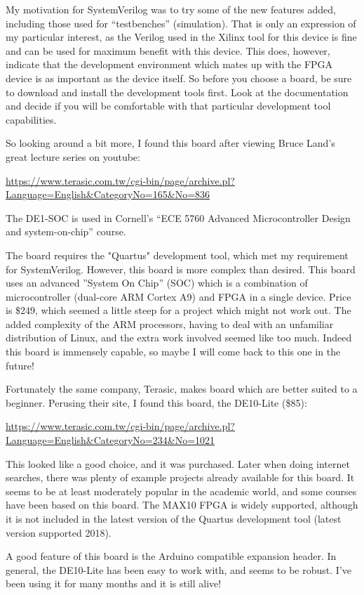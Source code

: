 My motivation for SystemVerilog was to try some of the new features added, including those used for ``testbenches'' (simulation).  That is only an expression of my particular interest, as the Verilog used in the Xilinx tool for this device is fine and can be used for maximum benefit with this device.  This does, however, indicate that the development environment which mates up with the FPGA device is as important as the device itself.  So before you choose a board, be sure to download and install the development tools first.  Look at the documentation and decide if you will be comfortable with that particular development tool capabilities.

So looking around a bit more, I found this board after viewing Bruce Land's great lecture series on youtube:

\url{https://www.terasic.com.tw/cgi-bin/page/archive.pl?Language=English&CategoryNo=165&No=836}

The DE1-SOC is used in Cornell's ``ECE 5760 Advanced Microcontroller Design and system-on-chip'' course.

The board requires the "Quartus" development tool, which met my requirement for SystemVerilog.  However, this board is more complex than desired.  This board uses an advanced ''System On Chip'' (SOC) which is a combination of microcontroller (dual-core ARM Cortex A9) and FPGA in a single device.  Price is \$249, which seemed a little steep for a project which might not work out.  The added complexity of the ARM processors, having to deal with an unfamiliar distribution of Linux, and the extra work involved seemed like too much.  Indeed this board is immensely capable, so maybe I will come back to this one in the future!

Fortunately the same company, Terasic, makes board which are better suited to a beginner.  Perusing their site, I found this board, the DE10-Lite (\$85):

\url{https://www.terasic.com.tw/cgi-bin/page/archive.pl?Language=English&CategoryNo=234&No=1021}

This looked like a good choice, and it was purchased.  Later when doing internet searches, there was plenty of example projects already available for this board.  It seems to be at least moderately popular in the academic world, and some courses have been based on this board.  The MAX10 FPGA is widely supported, although it is not included in the latest version of the Quartus development tool (latest version supported 2018).

A good feature of this board is the Arduino compatible expansion header.  In general, the DE10-Lite has been easy to work with, and seems to be robust.  I've been using it for many months and it is still alive!



